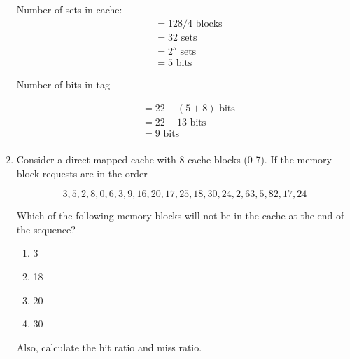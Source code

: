 \documentclass[12pt]{article}
\newcommand{\answeritem}{\global\answertrue\item}
\newcommand{\perhapsanswer}{%
  \ifanswer
    $\blacksquare$ \global\answerfalse
  \else
    $\square$ \global\answerfalse
  \fi
}
\newif\ifanswer
\begin{document}
\begin{enumerate}
  Number of sets in cache:
  \begin{align*}
    &= 128 / 4 \text{ blocks} \\
    &= 32 \text{ sets} \\
    &= 2^5 \text{ sets} \\
    &= 5 \text{ bits}
  \end{align*}

  Number of bits in tag

  \begin{align*}
    &= 22 - (5 + 8) \text{ bits} \\
    &= 22 - 13 \text{ bits} \\
    &= 9 \text{ bits} \\
  \end{align*}

  \setcounter{enumi}{7}
  \item Consider a direct mapped cache with 8 cache blocks (0-7). If the memory block requests are in the order-

  \begin{equation*}
    3, 5, 2, 8, 0, 6, 3, 9, 16, 20, 17, 25, 18, 30, 24, 2, 63, 5, 82, 17, 24
  \end{equation*}

  Which of the following memory blocks will not be in the cache at the end of the sequence?
  \begin{enumerate}[start=1,align=left,label={\protect\perhapsanswer(\alph*)}]
    \item 3
    \answeritem 18
    \item 20
    \item 30
  \end{enumerate}

  Also, calculate the hit ratio and miss ratio.


\end{enumerate}
\end{document}
